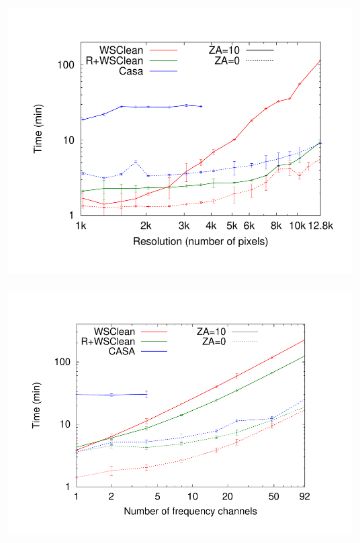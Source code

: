 \documentclass[useAMS,usenatbib]{mn2e}
\begin{document}
\begin{figure}
\begin{subfigure}{.5\linewidth}
\includegraphics[width=\linewidth]{img/benchmark-resolution/resolution}
\caption{}\label{fig:timing-resolution}%
\end{subfigure}%
\hspace{-.05\linewidth}\begin{subfigure}{.5\linewidth}%
\includegraphics[width=\linewidth]{img/benchmark-channels/channels}
\caption{}\label{fig:timing-channels}%
\end{subfigure}\\
\begin{subfigure}{.5\linewidth}%

\end{subfigure}
\end{figure}
\end{document}

